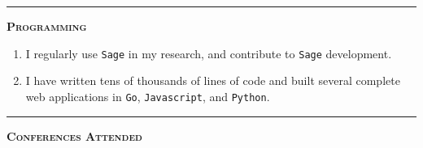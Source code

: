\documentclass[12pt]{article}
\newcommand{\sectionheading}[1]
{
\bigskip %
\noindent
\hspace{-6.5mm}\textcolor{Gray}{\rule[.75mm]{21.5mm}{1mm}} %
\hspace{.2mm}	%
{\large{\textbf{\textsc{#1}}}} %
}
\newenvironment{date_section}
	{
	\vspace{-1ex}
	\leftmargini = 15ex
		\begin{itemize}[
			labelsep = *,
			labelwidth = 9ex,
			labelindent = 0ex,
			itemindent = !,
			font=\normalfont,
			align=parleft
		]{}
		\itemsep=-1.5mm
	}
	{\end{itemize}\vspace{-2ex}}
\newcommand{\yearmo}[2]{
	\item[
		{\makebox[1ex][r]{#1}}
		\hspace{1ex}
		{\makebox[1ex][l]{#2} }
		] }
\begin{document}
	\sectionheading{Programming}%
	
	\begin{enumerate}[label=$\bullet$]
		\item I regularly use {\tt Sage} in my research, and contribute to {\tt Sage} development.
		\item I have written tens of thousands of lines of code and built several complete web applications in {\tt Go}, {\tt Javascript}, and {\tt Python}.
	\end{enumerate}



%	
%
%		
%			
%			
%			
%			
%			
%		


	\sectionheading{Conferences Attended} %
	
\end{document}
